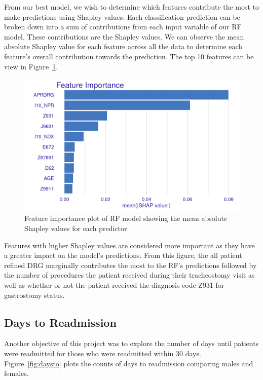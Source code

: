 \documentclass[sn-basic,pdflatex]{sn-jnl}
\theoremstyle{remark}
\theoremstyle{definition}
\begin{document}
From our best model, we wish to determine which features contribute the
most to make predictions using Shapley values. Each classification
prediction can be broken down into a sum of contributions from each
input variable of our RF model. These contributions are the Shapley
values. We can observe the mean absolute Shapley value for each feature
across all the data to determine each feature's overall contribution
towards the prediction. The top 10 features can be view in
Figure~\ref{fig:rf_imp}.

\begin{figure}[H]

{\centering \includegraphics[width=0.75\linewidth]{figures/rf_imp} 

}

\caption{Feature importance plot of RF model showing the mean absolute Shapley values for each predictor.}\label{fig:rf_imp}
\end{figure}

Features with higher Shapley values are considered more important as
they have a greater impact on the model's predictions. From this figure,
the all patient refined DRG marginally contributes the most to the RF's
predictions followed by the number of procedures the patient received
during their tracheostomy visit as well as whether or not the patient
received the diagnosis code Z931 for gastrostomy status.

\hypertarget{sec4B}{%
\subsection{Days to Readmission}\label{sec4B}}

Another objective of this project was to explore the number of days
until patients were readmitted for those who were readmitted within 30
days. Figure~\ref{fig:daysto} plots the counts of days to readmission
comparing males and females.
\end{document}
